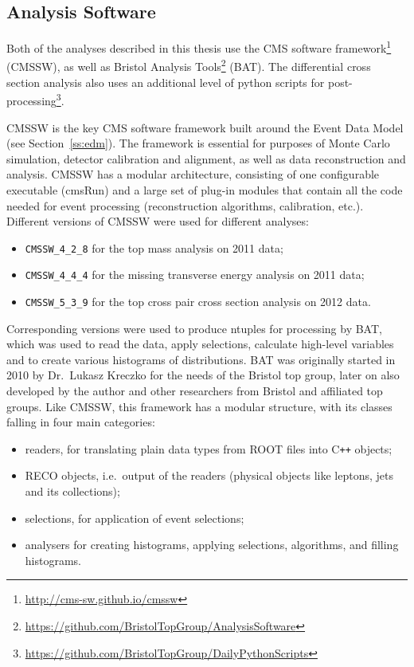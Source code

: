 \subsection{Analysis Software}
\label{ss:analysis_software}
Both of the analyses described in this thesis use the CMS software
framework\footnote{\url{http://cms-sw.github.io/cmssw}} (CMSSW), as well as Bristol Analysis
Tools\footnote{\url{https://github.com/BristolTopGroup/AnalysisSoftware}} (BAT). The differential cross section analysis
also uses an additional level of python scripts for
post-processing\footnote{\url{https://github.com/BristolTopGroup/DailyPythonScripts}}.

CMSSW is the key CMS software framework built around the Event Data Model (see Section~\ref{ss:edm}). The framework is
essential for purposes of Monte Carlo simulation, detector calibration and alignment, as well as data reconstruction
and analysis. CMSSW has a modular architecture, consisting of one configurable executable (cmsRun) and a large set of
plug-in modules that contain all the code needed for event processing (reconstruction algorithms, calibration, etc.).
Different versions of CMSSW were used for different analyses: 

\begin{itemize}
  \item \verb!CMSSW_4_2_8! for the top mass analysis on 2011 data;
  \item \verb!CMSSW_4_4_4! for the missing transverse energy analysis on 2011 data;
  \item \verb!CMSSW_5_3_9! for the top cross pair cross section analysis on 2012 data.
\end{itemize}

Corresponding versions were used to produce ntuples for processing by BAT, which was used to read the data, apply
selections, calculate high-level variables and to create various histograms of distributions. BAT was originally started
in 2010 by Dr.\ Lukasz Kreczko for the needs of the Bristol top group, later on also developed by the author and other
researchers from Bristol and affiliated top groups. Like CMSSW, this framework has a modular structure, with its classes
falling in four main categories:

\begin{itemize}
  \item readers, for translating plain data types from ROOT files into C\verb!++! objects;
  \item RECO objects, i.e.\ output of the readers (physical objects like leptons, jets and its collections);
  \item selections, for application of event selections;
  \item analysers for creating histograms, applying selections, algorithms, and filling histograms.
\end{itemize}

